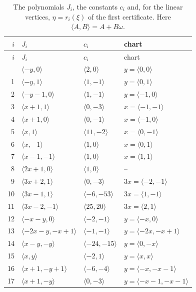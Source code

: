 \documentclass[11pt]{article}
\begin{document}
\begingroup\small
\setlength{\LTcapwidth}{\textwidth}
\begin{longtable}{@{}rlll@{}}
\caption{The polynomials $J_i$, the constants $c_i$ and, for the linear vertices, $\eta=r_i(\xi)$ of the first certificate. Here $\langle A,B\rangle=A+B\omega$.}\label{tab:cvert1}\\
\hline $i$ & $J_i$ & $c_i$ & chart\\\hline\endfirsthead\hline $i$ & $J_i$ & $c_i$ & chart\\\hline\endhead\hline\endfoot
0 & $\langle -y,0\rangle$ & $\langle 2,0\rangle$ & $y=\langle 0,0\rangle$\\
1 & $\langle -y,1\rangle$ & $\langle 1,-1\rangle$ & $y=\langle 0,1\rangle$\\
2 & $\langle -y-1,0\rangle$ & $\langle 1,-1\rangle$ & $y=\langle -1,0\rangle$\\
3 & $\langle x+1,1\rangle$ & $\langle 0,-3\rangle$ & $x=\langle -1,-1\rangle$\\
4 & $\langle x+1,0\rangle$ & $\langle 0,-1\rangle$ & $x=\langle -1,0\rangle$\\
5 & $\langle x,1\rangle$ & $\langle 11,-2\rangle$ & $x=\langle 0,-1\rangle$\\
6 & $\langle x,-1\rangle$ & $\langle 1,0\rangle$ & $x=\langle 0,1\rangle$\\
7 & $\langle x-1,-1\rangle$ & $\langle 1,0\rangle$ & $x=\langle 1,1\rangle$\\
8 & $\langle 2x+1,0\rangle$ & $\langle 1,0\rangle$ & --\\
9 & $\langle 3x+2,1\rangle$ & $\langle 0,-3\rangle$ & $3x=\langle -2,-1\rangle$\\
10 & $\langle 3x-1,1\rangle$ & $\langle -6,-53\rangle$ & $3x=\langle 1,-1\rangle$\\
11 & $\langle 3x-2,-1\rangle$ & $\langle 25,20\rangle$ & $3x=\langle 2,1\rangle$\\
12 & $\langle -x-y,0\rangle$ & $\langle -2,-1\rangle$ & $y=\langle -x,0\rangle$\\
13 & $\langle -2x-y,-x+1\rangle$ & $\langle -1,-1\rangle$ & $y=\langle -2x,-x+1\rangle$\\
14 & $\langle x-y,-y\rangle$ & $\langle -24,-15\rangle$ & $y=\langle 0,-x\rangle$\\
15 & $\langle x,y\rangle$ & $\langle -2,1\rangle$ & $y=\langle x,x\rangle$\\
16 & $\langle x+1,-y+1\rangle$ & $\langle -6,-4\rangle$ & $y=\langle -x,-x-1\rangle$\\
17 & $\langle x+1,-y\rangle$ & $\langle 0,-3\rangle$ & $y=\langle -x-1,-x-1\rangle$\\

\end{longtable}
\end{document}
